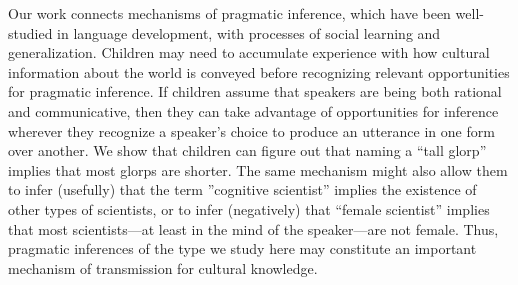 \documentclass[man]{apa2}
\begin{document}

Our work connects mechanisms of pragmatic inference, which have been well-studied in language development, with processes of social learning and generalization.  Children may need to accumulate experience with how cultural information about the world is conveyed before recognizing relevant opportunities for pragmatic inference. 
 If children assume that speakers are being both rational and communicative, then they can take advantage of opportunities for inference wherever they recognize a speaker's choice to produce an utterance in one form over another.  We show that children can figure out that naming a ``tall glorp'' implies that most glorps are shorter. The same mechanism might also allow them to infer (usefully) that the term ''cognitive scientist'' implies the existence of other types of scientists, or to infer (negatively) that ``female scientist'' implies that most scientists---at least in the mind of the speaker---are not female. Thus, pragmatic inferences of the type we study here may constitute an important mechanism of transmission for cultural knowledge.





\end{document}
